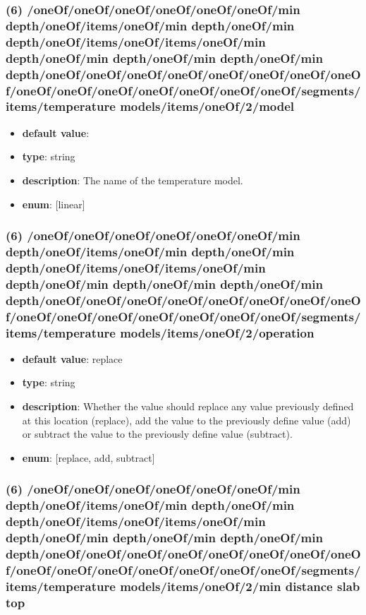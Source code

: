\subsubsection{(6) /oneOf/oneOf/oneOf/oneOf/oneOf/oneOf/min depth/oneOf/items/oneOf/min depth/oneOf/min depth/oneOf/items/oneOf/items/oneOf/min depth/oneOf/min depth/oneOf/min depth/oneOf/min depth/oneOf/oneOf/oneOf/oneOf/oneOf/oneOf/oneOf/oneOf/oneOf/oneOf/oneOf/oneOf/oneOf/oneOf/oneOf/segments/items/temperature models/items/oneOf/2/model}
\begin{itemize}[leftmargin=6em]\item {\bf default value}: 
\item {\bf type}: string
\item {\bf description}: The name of the temperature model.
\item {\bf enum}: [linear]\end{itemize}\subsubsection{(6) /oneOf/oneOf/oneOf/oneOf/oneOf/oneOf/min depth/oneOf/items/oneOf/min depth/oneOf/min depth/oneOf/items/oneOf/items/oneOf/min depth/oneOf/min depth/oneOf/min depth/oneOf/min depth/oneOf/oneOf/oneOf/oneOf/oneOf/oneOf/oneOf/oneOf/oneOf/oneOf/oneOf/oneOf/oneOf/oneOf/oneOf/segments/items/temperature models/items/oneOf/2/operation}
\begin{itemize}[leftmargin=6em]\item {\bf default value}: replace
\item {\bf type}: string
\item {\bf description}: Whether the value should replace any value previously defined at this location (replace), add the value to the previously define value (add) or subtract the value to the previously define value (subtract).
\item {\bf enum}: [replace, add, subtract]\end{itemize}\subsubsection{(6) /oneOf/oneOf/oneOf/oneOf/oneOf/oneOf/min depth/oneOf/items/oneOf/min depth/oneOf/min depth/oneOf/items/oneOf/items/oneOf/min depth/oneOf/min depth/oneOf/min depth/oneOf/min depth/oneOf/oneOf/oneOf/oneOf/oneOf/oneOf/oneOf/oneOf/oneOf/oneOf/oneOf/oneOf/oneOf/oneOf/oneOf/segments/items/temperature models/items/oneOf/2/min distance slab top}
